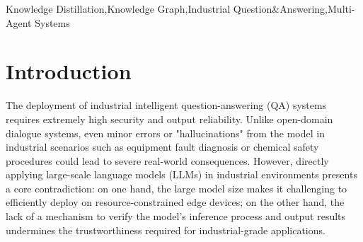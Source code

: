 \documentclass[preprint,12pt]{elsarticle}
\begin{document}
\begin{frontmatter}
\begin{abstract}
Industrial question-answering (QA) systems require higher safety and reliability than general-purpose dialogue models, as errors in high-risk scenarios such as equipment fault diagnosis can have severe consequences. Although multi-agent large language models enhance reasoning depth, they suffer from uncontrolled iterations and unverifiable outputs, and conventional distillation methods struggle to transfer collaborative reasoning capabilities to lightweight, deployable student models. To address these challenges, we propose Knowledge Graph-guided Multi-Agent System Distillation (KG-MASD). Our approach formulates distillation as a Markov Decision Process and incorporates a knowledge graph as a verifiable structured prior to enrich state representation and ensure convergence. By integrating collaborative reasoning with knowledge grounding, KG-MASD generates high-confidence instruction-tuning data and jointly distills reasoning depth and verifiability into compact student models suitable for edge deployment. Experiments on an industrial QA dataset show that KG-MASD improves accuracy by 2.4–20.1\% over baselines and significantly enhances reliability, enabling trustworthy AI deployment in safety-critical industrial scenarios. Code and data are available at \url{https://github.com/erwinmsmith/KG-MAD/}.
\end{abstract}


\begin{keyword}
Knowledge Distillation\sep Knowledge Graph\sep Industrial Question\&Answering\sep Multi-Agent Systems

\end{keyword}


\end{frontmatter}








\section{Introduction}
The deployment of industrial intelligent question-answering (QA) systems requires extremely high security and output reliability. Unlike open-domain dialogue systems, even minor errors or "hallucinations" from the model in industrial scenarios such as equipment fault diagnosis or chemical safety procedures could lead to severe real-world consequences. However, directly applying large-scale language models (LLMs) in industrial environments presents a core contradiction: on one hand, the large model size makes it challenging to efficiently deploy on resource-constrained edge devices; on the other hand, the lack of a mechanism to verify the model's inference process and output results undermines the trustworthiness required for industrial-grade applications.
\end{document}
